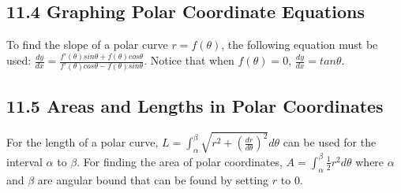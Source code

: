 \documentclass{article}
\begin{document}
        \subsection*{11.4 Graphing Polar Coordinate Equations}
            To find the slope of a polar curve $r=f(\theta)$, the following equation must be used: $\frac{dy}{dx} = \frac{f'(\theta)sin\theta + f(\theta)cos\theta}{f'(\theta)cos\theta - f(\theta)sin\theta}$. Notice that when $f(\theta) = 0$, $\frac{dy}{dx} = tan \theta$.
        \color{BurntOrange}
        \subsection*{11.5 Areas and Lengths in Polar Coordinates}
            For the length of a polar curve, $L = \int_{\alpha}^{\beta} \sqrt{r^2 + (\frac{dr}{d\theta})^2} d\theta$ can be used for the interval $\alpha$ to $\beta$. For finding the area of polar coordinates, $A = \int_{\alpha}^{\beta} \frac{1}{2} r^2 d \theta$ where $\alpha$ and $\beta$ are angular bound that can be found by setting $r$ to $0$. 
        \color{NavyBlue}
\end{document}
